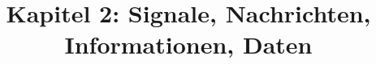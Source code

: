 \documentclass[18pt]{beamer}
\title[Signale, Nachrichten...]{Kapitel 2: Signale, Nachrichten, Informationen, Daten}
\begin{document}

\begin{frame}
 \titlepage
\end{frame}

\def\showSolutions{1}					 %

\title[Signale]{}

\end{document}
